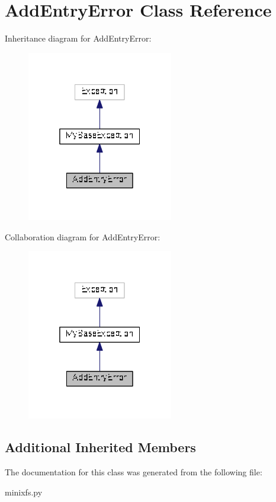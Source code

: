 \hypertarget{classminixfs_1_1_add_entry_error}{}\section{Add\+Entry\+Error Class Reference}
\label{classminixfs_1_1_add_entry_error}


Inheritance diagram for Add\+Entry\+Error\+:
\nopagebreak
\begin{figure}[H]
\begin{center}
\leavevmode
\includegraphics[width=181pt]{classminixfs_1_1_add_entry_error__inherit__graph}
\end{center}
\end{figure}


Collaboration diagram for Add\+Entry\+Error\+:
\nopagebreak
\begin{figure}[H]
\begin{center}
\leavevmode
\includegraphics[width=181pt]{classminixfs_1_1_add_entry_error__coll__graph}
\end{center}
\end{figure}
\subsection*{Additional Inherited Members}


The documentation for this class was generated from the following file\+:\begin{DoxyCompactItemize}
\item 
minixfs.\+py\end{DoxyCompactItemize}
